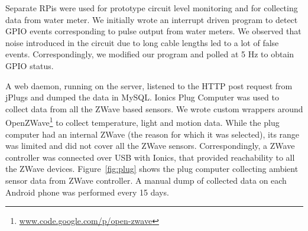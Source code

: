 \documentclass[10pt]{sensys-proc}
\newcommand{\figref}[1]{Figure~\ref{#1}}
\newcommand{\secref}[1]{Section~\ref{#1}}
\newcommand{\paradigm}{Sense Local-store Upload}
\newcommand{\selstup}{SLsU}
\begin{document}
Separate RPis were used for prototype circuit level monitoring and for collecting data from water meter. %
We initially wrote an interrupt driven program to detect GPIO events corresponding to pulse output from water meters. We observed that noise introduced in the circuit due to long cable lengths led to a lot of false events. Correspondingly, we modified our program and polled at 5 Hz to obtain GPIO status. %

A web daemon, running on the server, listened to the HTTP post request from jPlugs and dumped the data in MySQL. Ionics Plug Computer was used to collect data from all the ZWave based sensors. We wrote custom wrappers around OpenZWave\footnote{\url{www.code.google.com/p/open-zwave}} to collect temperature, light and motion data. While the plug computer had an internal ZWave (the reason for which it was selected), its range was limited and did not cover all the ZWave sensors. Correspondingly, a ZWave controller was connected over USB with Ionics, that provided reachability to all the ZWave devices. %
\figref{fig:plug} shows the plug computer collecting ambient sensor data from ZWave controller. A manual dump of collected data on each Android phone was performed every 15 days.


\end{document}
